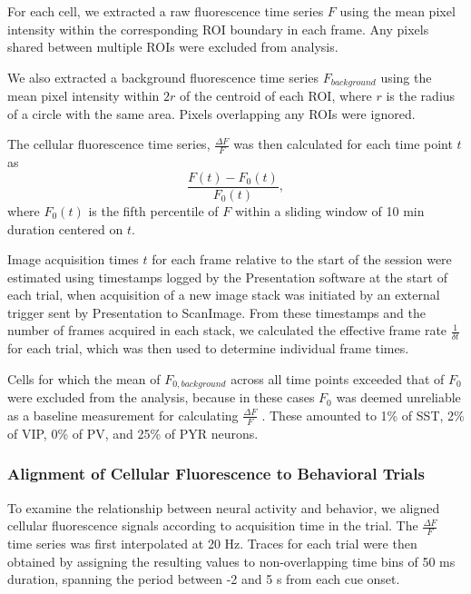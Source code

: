 For each cell, we extracted a raw fluorescence time series $F$ using the mean pixel intensity within the corresponding ROI boundary in each frame. Any pixels shared between multiple ROIs were excluded from analysis. 

We also extracted a background fluorescence time series $F_{\mathit{background}}$ using the mean pixel intensity within $2r$ of the centroid of each ROI, where $r$ is the radius of a circle with the same area. Pixels overlapping any ROIs were ignored.

The cellular fluorescence time series, $\frac{\Delta F}{F}$ was then calculated for each time point $t$ as 
\begin{equation*}
\frac{F(t)-F_0(t)}{F_0(t)},
\end{equation*} where $F_0(t)$ is the fifth percentile of $F$ within a sliding window of 10 min duration centered on $t$.  

Image acquisition times $t$ for each frame relative to the start of the session were estimated using timestamps logged by the Presentation software at the start of each trial, when acquisition of a new image stack was initiated by an external trigger sent by Presentation to ScanImage. From these timestamps and the number of frames acquired in each stack, we calculated the effective frame rate $\frac{1}{\delta t}$ for each trial, which was then used to determine individual frame times. 

Cells for which the mean of $F_{0,\mathit{background}}$ across all time points exceeded that of $F_{0}$ were excluded from the analysis, because in these cases $F_{0}$ was deemed unreliable as a baseline measurement for calculating $\frac{\Delta F}{F}$ \citep{dana2014thy1}. These amounted to 1\% of SST, 2\% of VIP, 0\% of PV, and 25\% of PYR neurons.

\subsubsection*{Alignment of Cellular Fluorescence to Behavioral Trials}

To examine the relationship between neural activity and behavior, we aligned cellular fluorescence signals according to acquisition time in the trial. The $\frac{\Delta F}{F}$ time series was first interpolated at 20 Hz. Traces for each trial were then obtained by assigning the resulting values to non-overlapping time bins of 50 ms duration, spanning the period between -2 and 5 s from each cue onset.

